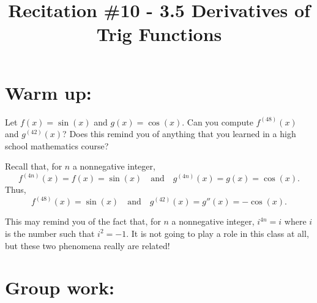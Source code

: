 \documentclass[handout,nooutcomes]{ximera}
\title{Recitation \#10 - 3.5 Derivatives of Trig Functions}
\begin{document}
\begin{abstract}		\end{abstract}
\maketitle

\section*{Warm up:} 
Let $f(x) = \sin(x)$ and $g(x) = \cos(x)$.  Can you compute $f^{(48)}(x)$ and $g^{(42)}(x)$?  Does this remind you of anything that you learned in a high school mathematics course?
	\begin{freeResponse}
	Recall that, for $n$ a nonnegative integer, 
	$$f^{(4n)}(x) = f(x) = \sin(x) \quad \text{and} \quad g^{(4n)}(x) = g(x) = \cos(x).$$
	Thus, 
	$$f^{(48)}(x) = \sin(x) \quad \text{and} \quad g^{(42)}(x) = g''(x) = - \cos(x).$$  

	This may remind you of the fact that, for $n$ a nonnegative integer, $i^{4n} = i$ where $i$ is the number such that $i^2 = -1$.  It is not going to play a role in this class at all, but these two phenomena really are related!
	\end{freeResponse}	
	
	
	
	
	

\section*{Group work:}
\end{document}
